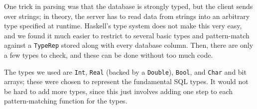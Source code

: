 One trick in parsing was that the database is strongly typed, but the client sends over strings; in theory, the server has to read data from strings into an arbitrary type specified at runtime. Haskell's type system does not make this very easy, and we found it much easier to restrict to several basic types and pattern-match against a \verb+TypeRep+ stored along with every database column. Then, there are only a few types to check, and these can be done without too much code.

The types we used are \verb+Int+, \verb+Real+ (backed by a \verb+Double+), \verb+Bool+, and \verb+Char+ and bit arrays; these were chosen to represent the fundamental SQL types. It would not be hard to add more types, since this just involves adding one step to each pattern-matching function for the types.
